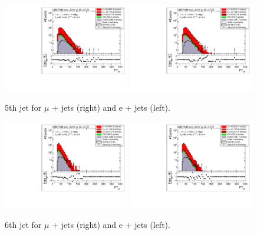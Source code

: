 \begin{figure}[!ht]
    \includegraphics[width=0.49\textwidth]{images/Run1/5thJetPt_StackLogY_Mu.pdf}
    \includegraphics[width=0.49\textwidth]{images/Run1/5thJetPt_StackLogY_e.pdf}
    \caption{5th jet \pt for $\mu$ + jets (right) and e + jets (left).}
    \label{fig:5thjetpt}
\end{figure}

\begin{figure}[!ht]
    \includegraphics[width=0.49\textwidth]{images/Run1/6thJetPt_StackLogY_Mu.pdf}
    \includegraphics[width=0.49\textwidth]{images/Run1/6thJetPt_StackLogY_e.pdf}
    \caption{6th jet \pt for $\mu$ + jets (right) and e + jets (left).}
    \label{fig:6thjetpt}
\end{figure}

